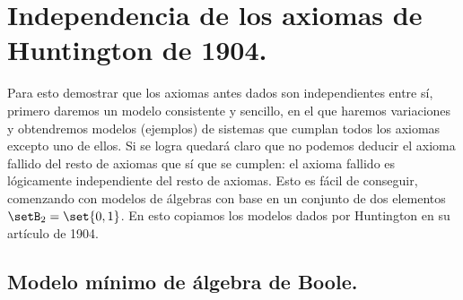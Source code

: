 \section{Independencia de los axiomas de Huntington de 1904.}



	Para esto demostrar que los axiomas antes dados son independientes entre
sí, primero daremos un modelo consistente y sencillo, en el que haremos
variaciones y obtendremos modelos (ejemplos) de sistemas que cumplan todos
los axiomas excepto uno de ellos. Si se logra quedará claro que no podemos
deducir el axioma fallido del resto de axiomas que sí que se cumplen: el
axioma fallido es lógicamente independiente del resto de axiomas. Esto es
fácil de conseguir, comenzando con modelos de álgebras con base en un
conjunto de dos elementos \({\setB}_2 = \set{0,1}\). En esto copiamos los
modelos dados por Huntington en su artículo de 1904.



\subsection{Modelo mínimo de álgebra de Boole.}




